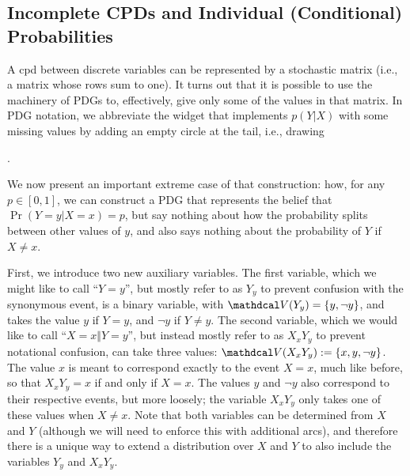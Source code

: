\subsection{Incomplete CPDs and Individual (Conditional) Probabilities}
    \label{sec:prob-widget}
    
A cpd between discrete variables can be represented by
    a stochastic matrix (i.e., a matrix whose rows sum to one).
It turns out that it is possible to use the machinery of PDGs
    to, effectively, give only some of the values in that matrix.
In PDG notation, we abbreviate the widget that implements $p(Y|X)$ with some missing values by adding an empty circle at the tail, i.e., drawing 
.    

We now present an important extreme case of that construction:
how, for any $p \in [0,1]$, we can construct a PDG
that represents the belief that $\Pr(Y{=}y|X={x}) = p$, but say nothing about
how the probability splits between other values of $y$, and also says nothing
about the probability of $Y$ if $X \ne x$.


\def\XxYy{{X{=}x\Vert Y{=}y}}
\def\XxYyshort{{X_x Y_y}}
\def\Yy{{Y{=}y}}
\def\Yyshort{{Y_y}}

First, we introduce two new auxiliary variables.
The first variable, which we might like to call ``$\Yy$'', but
    mostly refer to as $\Yyshort$ to prevent confusion with the synonymous
    event, is a binary variable, with $\V(\Yyshort) = \{y, \lnot y\}$,
    and takes the value $y$ if $Y=y$, and $\lnot y$ if $Y \ne y$.
The second variable, which we would like to call ``$\XxYy$'',
    but instead mostly refer to as $\XxYyshort$ to prevent notational confusion,
    can take three values: $\V(\XxYyshort):= \{ x, y, \lnot y \}$.
The value $x$ is meant to correspond exactly to the event $X{=}x$,
    much like before, so that $\XxYyshort = x$ if and only if $X = x$.
The values $y$ and $\lnot y$ also correspond to their respective
    events, but more loosely; the variable $\XxYyshort$ only takes one of these
    values when $X \ne x$.
Note that both variables can be determined from $X$ and $Y$
(although we will need to enforce this with additional arcs), and
therefore there is a unique way to extend a
distribution over $X$ and $Y$ to also include the variables $\Yyshort$ and $\XxYyshort$.

